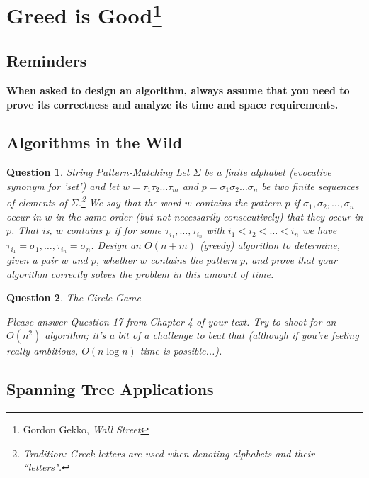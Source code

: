 \documentclass[10pt]{article}
\newtheorem{question}{Question}
\begin{document}
\section*{Greed is Good\footnote{Gordon Gekko, \emph{Wall Street}}}

\subsection*{Reminders}

\vspace{5pt}

\textbf{When asked to design an algorithm, always assume that you need to prove its correctness and analyze its
time and space requirements.}

\subsection*{Algorithms in the Wild}

\begin{question}{String Pattern-Matching}
Let $\Sigma$ be a finite alphabet (evocative synonym for 'set') and let $w = \tau_1 \tau_2 \ldots  \tau_m$ and $p = \sigma_1 \sigma_2 \ldots \sigma_n$
be two finite sequences of elements of $\Sigma$.\footnote{Tradition: Greek letters are used when denoting alphabets and their ``letters".}  We say that the word $w$ {\em contains} the pattern $p$ if $\sigma_1, \sigma_2,\ldots,  \sigma_n$
occur in $w$ in the same order (but not necessarily consecutively) that they occur in $p$.   That is, $w$ contains $p$ if for some
$\tau_{i_1}, \ldots , \tau_{i_n}$ with $i_1 < i_2 < \ldots < i_n$ we have $\tau_{i_1} = \sigma_1, \ldots , \tau_{i_n} = \sigma_n$.
Design an $O(n+m)$ (greedy) algorithm to determine, given a pair $w$ and $p$, whether $w$ contains the pattern $p$, and prove that your
algorithm correctly solves the problem in this amount of time.
\end{question}

\begin{question}{The Circle Game}

Please answer Question 17 from Chapter 4 of your text.  Try to shoot for an $O(n^2)$ algorithm; it's a bit of a challenge to beat that (although if you're feeling really ambitious, $O(n \log n)$ time is possible...).
\end{question}

\subsection*{Spanning Tree Applications}
\end{document}
